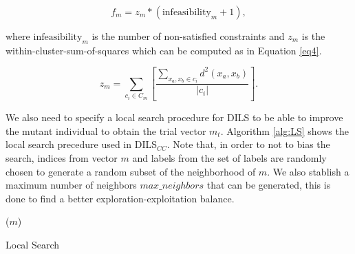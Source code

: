 \documentclass[review]{elsarticle}
\begin{document}
\begin{equation}
f_m = z_m * (\text{infeasibility}_m + 1),
\label{eq3}
\end{equation}

\noindent where $\text{infeasibility}_m$ is the number of non-satisfied constraints and $z_m$ is the within-cluster-sum-of-squares which can be computed as in Equation \eqref{eq4}.

\begin{equation}
z_m = \sum_{c_i \in C_m} \left[ \frac{\sum_{x_a, x_b \in c_i} d^2(x_a,x_b)}{|c_i|}\right].
\label{eq4}
\end{equation}

We also need to specify a local search procedure for DILS to be able to improve the mutant individual to obtain the trial vector $m_t$. Algorithm \ref{alg:LS} shows the local search precedure used in DILS$_{CC}$. Note that, in order to not to bias the search, indices from vector $m$ and labels from the set of labels are randomly chosen to generate a random subset of the neighborhood of $m$. We also stablish a maximum number of neighbors $max\_neighbors$ that can be generated, this is done to find a better exploration-exploitation balance.

\begin{algorithm}
	\SetNlSkip{0.5em}
	\BlankLine
	\BlankLine
	\KwRet ($m$)
	
	\caption{Local Search}\label{alg:LS}
\end{algorithm}
\end{document}

